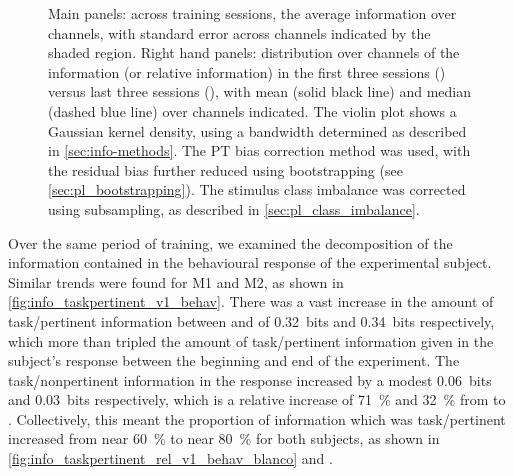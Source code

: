 \begin{figure}[htbp]
{Main panels: across training sessions, the average information over channels, with standard error across channels indicated by the shaded region.
Right hand panels: distribution over channels of the information (or relative information) in the first three sessions () versus last three sessions (), with mean (solid black line) and median (dashed blue line) over channels indicated.
The violin plot shows a Gaussian kernel density, using a bandwidth determined as described in \autoref{sec:info-methods}.
The \ac{PT} bias correction method was used, with the residual bias further reduced using bootstrapping (see \autoref{sec:pl_bootstrapping}).
The stimulus class imbalance was corrected using subsampling, as described in \autoref{sec:pl_class_imbalance}.
    \label{fig:info_taskpertinent_v1_ch}
}
\end{figure}


Over the same period of training, we examined the decomposition of the information contained in the behavioural response of the experimental subject.
Similar trends were found for \ac{M1} and \ac{M2}, as shown in \autoref{fig:info_taskpertinent_v1_behav}.
There was a vast increase in the amount of task\-/pertinent information between  and  of \SI{+0.32}{bits} and \SI{+0.34}{bits} respectively, which more than tripled the amount of task\-/pertinent information given in the subject's response between the beginning and end of the experiment.
The task\-/nonpertinent information in the response increased by a modest \SI{+0.06}{bits} and \SI{+0.03}{bits} respectively, which is a relative increase of \SI{71}{\percent} and \SI{32}{\percent} from  to .
Collectively, this meant the proportion of information which was task\-/pertinent increased from near \SI{60}{\percent} to near \SI{80}{\percent} for both subjects, as shown in \autoref{fig:info_taskpertinent_rel_v1_behav_blanco} and .

%

